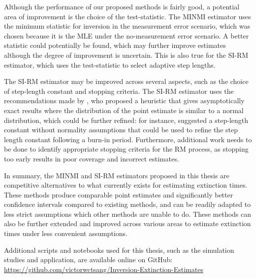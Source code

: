 Although the performance of our proposed methods is fairly good, a potential area of improvement is the choice of the test-statistic. The MINMI estimator uses the minimum statistic for inversion in the measurement error scenario, which was chosen because it is the MLE under the no-measurement error scenario. A better statistic could potentially be found, which may further improve estimates although the degree of improvement is uncertain. This is also true for the SI-RM estimator, which uses the test-statistic to select adaptive step lengths.

The SI-RM estimator may be improved across several aspects, such as the choice of step-length constant and stopping criteria. The SI-RM estimator uses the recommendations made by \citet{Garthwaite1992}, who proposed a heuristic that gives asymptotically exact results where the distribution of the point estimate is similar to a normal distribution, which could be further refined: for instance, \citet{LlyodBotev2015} suggested a step-length constant without normality assumptions that could be used to refine the step length constant following a burn-in period. Furthermore, additional work needs to be done to identify appropriate stopping criteria for the RM process, as stopping too early results in poor coverage and incorrect estimates.

In summary, the MINMI and SI-RM estimators proposed in this thesis are competitive alternatives to what currently exists for estimating extinction times. These methods produce comparable point estimates and significantly better confidence intervals compared to existing methods, and can be readily adapted to less strict assumptions which other methods are unable to do. These methods can also be further extended and improved across various areas to estimate extinction times under less convenient assumptions.

Additional scripts and notebooks used for this thesis, such as the simulation studies and application, are available online on GitHub: \url{https://github.com/victorwctsang/Inversion-Extinction-Estimates}